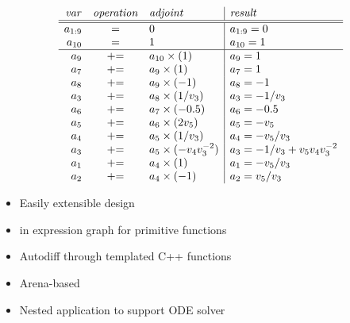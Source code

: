 \documentclass[10pt]{report}
\begin{document}
%
{\small
\[
\begin{array}{rcl|l}
{\it var} & {\it operation} & {\it adjoint} & {\it result}
\\ \hline \hline
a_{1:9} & = & 0 & a_{1:9} = 0
\\
a_{10} & = & 1 & a_{10} = 1
\\ \hline
a_{9} & {+}{=} & a_{10} \times (1) & a_9 = 1
\\
a_{7} & {+}{=} & a_9 \times (1) & a_7 = 1
\\
a_{8} & {+}{=} & a_9 \times (-1) & a_8 = -1
\\
a_{3} & {+}{=} & a_8 \times (1 / v_3) & a_3 = -1 / v_3
\\
a_{6} & {+}{=} & a_7 \times (-0.5) & a_6 = -0.5
\\
a_{5} & {+}{=} & a_6 \times (2 v_5) & a_5 = -v_5
\\
a_{4} & {+}{=} & a_5 \times (1 / v_3) & a_4 = -v_5 / v_3
\\
a_{3} & {+}{=} & a_5 \times (-v_4 v_3^{-2}) & a_3 = -1 / v_3 + v_5 v_4 v_3^{-2}
\\
a_{1} & {+}{=} & a_4 \times (1) & a_1 = -v_5 / v_3
\\
a_{2} & {+}{=} & a_4 \times (-1) & a_2 = v_5 / v_3
\end{array}
\]
}


%
\begin{itemize}
\item Easily extensible  design
%
\item {} in expression graph for primitive functions
%
\item Autodiff through templated C++ functions
%
\end{itemize}


%
\begin{itemize}
\item Arena-based 
\item Nested application to support ODE solver
\end{itemize}
\end{document}
